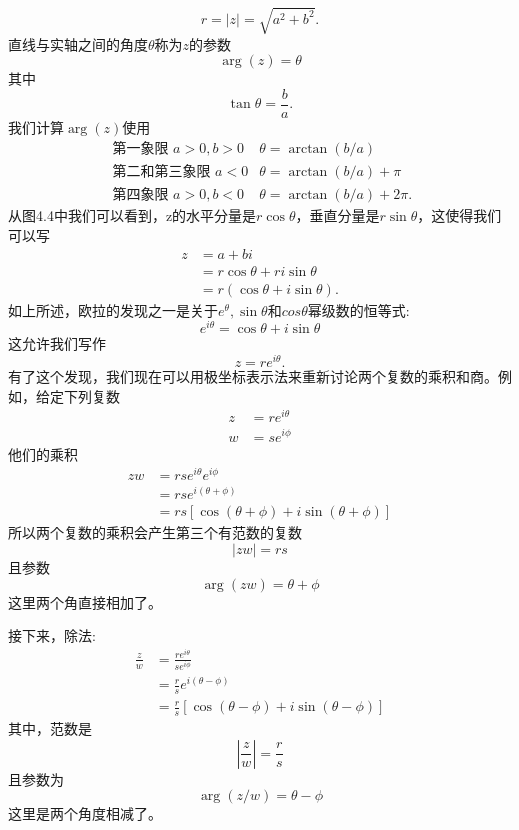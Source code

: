 $$
r=|z|=\sqrt{a^{2}+b^{2}} .
$$
直线与实轴之间的角度$\theta$称为$z$的参数
$$
\arg (z)=\theta
$$
其中
$$
\tan \theta=\frac{b}{a} .
$$
我们计算$\arg (z)$使用
$$
\begin{array}{ll}
\text { 第一象限 } a>0, b>0 & \theta=\arctan (b / a) \\
\text { 第二和第三象限 } a<0 & \theta=\arctan (b / a)+\pi \\
\text { 第四象限 } a>0, b<0 & \theta=\arctan (b / a)+2 \pi .
\end{array}
$$
从图4.4中我们可以看到，z的水平分量是$r \cos \theta$，垂直分量是$r \sin \theta$，这使得我们可以写
$$
\begin{aligned}
z & =a+b i \\
& =r \cos \theta+r i \sin \theta \\
& =r(\cos \theta+i \sin \theta) .
\end{aligned}
$$
如上所述，欧拉的发现之一是关于$e^{\theta}, \sin \theta$和$ cos \theta$幂级数的恒等式:
$$
e^{i \theta}=\cos \theta+i \sin \theta
$$
这允许我们写作
$$
z=r e^{i \theta} .
$$
有了这个发现，我们现在可以用极坐标表示法来重新讨论两个复数的乘积和商。例如，给定下列复数
$$
\begin{aligned}
z & =r e^{i \theta} \\
w & =s e^{i \phi}
\end{aligned}
$$
他们的乘积
$$
\begin{aligned}
z w & =r s e^{i \theta} e^{i \phi} \\
& =r s e^{i(\theta+\phi)} \\
& =r s[\cos (\theta+\phi)+i \sin (\theta+\phi)]
\end{aligned}
$$
所以两个复数的乘积会产生第三个有范数的复数
$$
|z w|=r s
$$
且参数
$$
\arg (z w)=\theta+\phi
$$
这里两个角直接相加了。

接下来，除法:
$$
\begin{aligned}
\frac{z}{w} & =\frac{r e^{i \theta}}{s e^{i \phi}} \\
& =\frac{r}{s} e^{i(\theta-\phi)} \\
& =\frac{r}{s}[\cos (\theta-\phi)+i \sin (\theta-\phi)]
\end{aligned}
$$
其中，范数是
$$
\left|\frac{z}{w}\right|=\frac{r}{s}
$$
且参数为
$$
\arg (z / w)=\theta-\phi
$$
这里是两个角度相减了。

